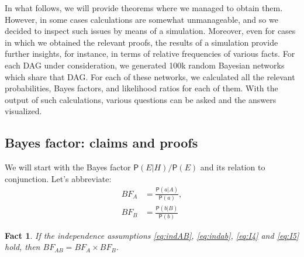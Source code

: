 \documentclass[
  10pt,
  dvipsnames,enabledeprecatedfontcommands]{scrartcl}
\newtheorem{fact}{Fact}
\newcommand{\pr}[1]{\ensuremath{\mathsf{P}(#1)}}
\begin{document}
In what follows, we will provide theorems where we managed to obtain
them. However, in some cases calculations are somewhat unmanageable, and
so we decided to inspect such issues by means of a simulation. Moreover,
even for cases in which we obtained the relevant proofs, the results of
a simulation provide further insights, for instance, in terms of
relative frequencies of various facts. For each DAG under consideration,
we generated 100k random Bayesian networks which share that DAG. For
each of these networks, we calculated all the relevant probabilities,
Bayes factors, and likelihood ratios for each of them. With the output
of such calculations, various questions can be asked and the answers
visualized.

\hypertarget{bayes-factor-claims-and-proofs}{%
\subsection*{Bayes factor: claims and
proofs}\label{bayes-factor-claims-and-proofs}}

We will start with the Bayes factor \(\pr{E \vert H}/\pr{E}\) and its
relation to conjunction. Let's abbreviate: \begin{align*}
BF_A  & =  \frac{\pr{a \vert A}}{\pr{a}},\\
BF_B & = \frac{\pr{b \vert B}}{\pr{b}}
\end{align*}

\begin{fact} If the independence assumptions \eqref{eq:indAB}, \eqref{eq:indab}, \eqref{eq:I4} and \eqref{eq:I5} hold, then 
$BF_{AB} = BF_A \times BF_B$. \label{fac:BFindep}
\end{fact}
\end{document}
